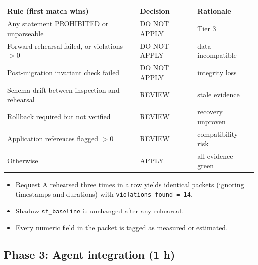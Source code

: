 \documentclass[11pt,a4paper]{article}
\newcommand{\fp}[1]{\nolinkurl{#1}}  %
\begin{document}
\begin{longtable}{@{}L{8.2cm}L{2.6cm}L{4.8cm}@{}}
\toprule
\sffamily\bfseries Rule (first match wins) & \sffamily\bfseries Decision & \sffamily\bfseries Rationale \\
\midrule
Any statement PROHIBITED or unparseable & DO NOT APPLY & Tier 3 \\
Forward rehearsal failed, or violations $> 0$ & DO NOT APPLY & data incompatible \\
Post-migration invariant check failed & DO NOT APPLY & integrity loss \\
Schema drift between inspection and rehearsal & REVIEW & stale evidence \\
Rollback required but not verified & REVIEW & recovery unproven \\
Application references flagged $> 0$ & REVIEW & compatibility risk \\
Otherwise & APPLY & all evidence green \\
\bottomrule
\end{longtable}

\begin{acceptbox}
\begin{itemize}[leftmargin=*]
  \item Request A rehearsed three times in a row yields identical packets
        (ignoring timestamps and durations) with \texttt{violations\_found = 14}.
  \item Shadow \fp{sf_baseline} is unchanged after any rehearsal.
  \item Every numeric field in the packet is tagged as measured or estimated.
\end{itemize}
\end{acceptbox}

\subsection{Phase 3: Agent integration (1 h)}
\label{sec:p3}
\end{document}
